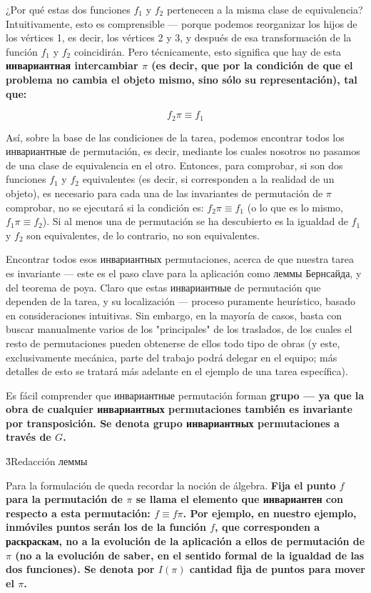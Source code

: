 ¿Por qué estas dos funciones $f_1$ y $f_2$ pertenecen a la misma clase de equivalencia? Intuitivamente, esto es comprensible --- porque podemos reorganizar los hijos de los vértices 1, es decir, los vértices 2 y 3, y después de esa transformación de la función $f_1$ y $f_2$ coincidirán. Pero técnicamente, esto significa que hay de esta \bf{инвариантная intercambiar} $\pi$ (es decir, que por la condición de que el problema no cambia el objeto mismo, sino sólo su representación), tal que:

$$ f_2 \pi \equiv f_1 $$

Así, sobre la base de las condiciones de la tarea, podemos encontrar todos los инвариантные de permutación, es decir, mediante los cuales nosotros no pasamos de una clase de equivalencia en el otro. Entonces, para comprobar, si son dos funciones $f_1$ y $f_2$ equivalentes (es decir, si corresponden a la realidad de un objeto), es necesario para cada una de las invariantes de permutación de $\pi$ comprobar, no se ejecutará si la condición es: $f_2 \pi \equiv f_1$ (o lo que es lo mismo, $f_1 \pi \equiv f_2$). Si al menos una de permutación se ha descubierto es la igualdad de $f_1$ y $f_2$ son equivalentes, de lo contrario, no son equivalentes.

Encontrar todos esos инвариантных permutaciones, acerca de que nuestra tarea es invariante --- este es el paso clave para la aplicación como леммы Бернсайда, y del teorema de poya. Claro que estas инвариантные de permutación que dependen de la tarea, y su localización --- proceso puramente heurístico, basado en consideraciones intuitivas. Sin embargo, en la mayoría de casos, basta con buscar manualmente varios de los "principales" de los traslados, de los cuales el resto de permutaciones pueden obtenerse de ellos todo tipo de obras (y este, exclusivamente mecánica, parte del trabajo podrá delegar en el equipo; más detalles de esto se tratará más adelante en el ejemplo de una tarea específica).

Es fácil comprender que инвариантные permutación forman \bf{grupo} --- ya que la obra de cualquier инвариантных permutaciones también es invariante por transposición. Se denota \bf{grupo инвариантных permutaciones} a través de $G$.

\h3{Redacción леммы}

Para la formulación de queda recordar la noción de álgebra. \bf{Fija el punto} $f$ para la permutación de $\pi$ se llama el elemento que инвариантен con respecto a esta permutación: $f \equiv f \pi$. Por ejemplo, en nuestro ejemplo, inmóviles puntos serán los de la función $f$, que corresponden a раскраскам, no a la evolución de la aplicación a ellos de permutación de $\pi$ (no a la evolución de saber, en el sentido formal de la igualdad de las dos funciones). Se denota por $I(\pi)$ \bf{cantidad fija de puntos} para mover el $\pi$.


